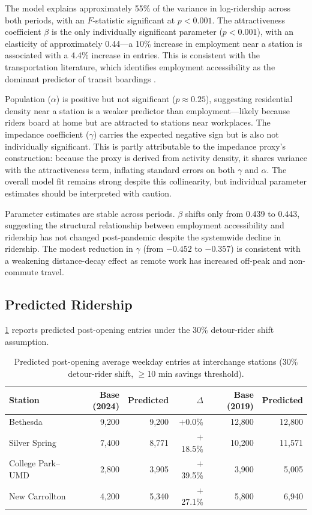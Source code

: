 \documentclass[11pt]{article}
\begin{document}
The model explains approximately 55\% of the variance in log-ridership
across both periods, with an $F$-statistic significant at $p < 0.001$. The
attractiveness coefficient $\beta$ is the only individually significant
parameter ($p < 0.001$), with an elasticity of approximately 0.44---a 10\%
increase in employment near a station is associated with a 4.4\% increase
in entries. This is consistent with the transportation literature, which
identifies employment accessibility as the dominant predictor of transit
boardings \citep{cardozo2012}.

Population ($\alpha$) is positive but not significant ($p \approx 0.25$),
suggesting residential density near a station is a weaker predictor than
employment---likely because riders board at home but are attracted to
stations near workplaces. The impedance coefficient ($\gamma$) carries the
expected negative sign but is also not individually significant. This is
partly attributable to the impedance proxy's construction: because the proxy
is derived from activity density, it shares variance with the attractiveness
term, inflating standard errors on both $\gamma$ and $\alpha$. The overall
model fit remains strong despite this collinearity, but individual parameter
estimates should be interpreted with caution.

Parameter estimates are stable across periods. $\beta$ shifts only from
0.439 to 0.443, suggesting the structural relationship between employment
accessibility and ridership has not changed post-pandemic despite the
systemwide decline in ridership. The modest reduction in $\gamma$ (from
$-0.452$ to $-0.357$) is consistent with a weakening distance-decay effect
as remote work has increased off-peak and non-commute travel.

\subsection{Predicted Ridership}

\cref{tab:predictions} reports predicted post-opening entries under the
30\% detour-rider shift assumption.

\begin{table}[H]
    \centering
    \caption{Predicted post-opening average weekday entries at interchange
             stations (30\% detour-rider shift, $\geq$10 min savings threshold).}
    \label{tab:predictions}
    \begin{tabular}{lrrrrr}
        \toprule
        Station & Base (2024) & Predicted & $\Delta$ & Base (2019) & Predicted \\
        \midrule
        Bethesda          & 9,200  & 9,200  & $+$0.0\%  & 12,800 & 12,800 \\
        Silver Spring     & 7,400  & 8,771  & $+$18.5\% & 10,200 & 11,571 \\
        College Park--UMD & 2,800  & 3,905  & $+$39.5\% & 3,900  & 5,005 \\
        New Carrollton    & 4,200  & 5,340  & $+$27.1\% & 5,800  & 6,940 \\
        \bottomrule
    \end{tabular}
\end{table}
\end{document}
